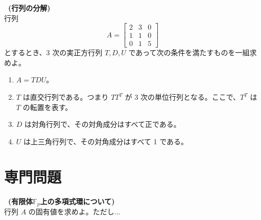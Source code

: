\documentclass[12pt]{article}
\renewcommand{\labelenumi}{(\arabic{enumi})}
\newcommand{\mondai}[2]{\textbf{\fbox{#1}\ (#2)}}
\newcommand{\F}{\mathbb{F}}
\begin{document}
\begin{comment}
### **(1) 漸化式の導出**
積分の中にべき乗や対数が含まれている場合、部分積分を繰り返すことで**漸化式**を導くことができます。  
この手法は、多くの難関大学の入試や大学院試験、数学オリンピックでも頻出です。

例えば、部分積分の基本形
\[
\int u dv = uv - \int v du
\]
を使うことで、\( I_n \) を \( I_{n-1} \) の形に帰着させます。  
これにより、再帰的に求めることができるようになります。

---

## **この問題の背景**
これらの問題は **解析学（微積分・関数の性質）** に関するものです。  
大学数学や大学院試験の頻出テーマであり、数学オリンピックや難関大学の入試にも登場します。

特に **極限の評価・関数の滑らかさ・級数展開** などは、高度な数学を学ぶ上で重要なトピックです。  
また、漸化式の導出は **数学的帰納法や数列の解析** にもつながります。

---

## **基礎知識として必要なもの**
✅ **ロピタルの定理**（極限の計算）  
✅ **テイラー展開・マクローリン展開**（関数の近似）  
✅ **部分積分**（積分の計算テクニック）  
✅ **漸化式の考え方**（数学的帰納法と組み合わせて使う）  
✅ **微分可能性の定義**（左右の微分係数をそろえる）

---

この問題を解くことで、解析学の理解が深まり、入試・数学オリンピック・大学院試験での応用力が身につきます！
\end{comment}

\newpage

\mondai{A2}{行列の分解}\\

行列
\[
    A = \begin{bmatrix} 2 & 3 & 0 \\ 1 & 1 & 0 \\ 0 & 1 & 5 \end{bmatrix}
\]
とするとき、3 次の実正方行列 $T, D, U$ であって次の条件を満たすものを一組求めよ。

\begin{enumerate}
    \renewcommand{\labelenumi}{(\roman{enumi})}
    \item $A = TDU$。
    \item $T$ は直交行列である。つまり $TT^T$ が 3 次の単位行列となる。ここで、$T^T$ は $T$ の転置を表す。
    \item $D$ は対角行列で、その対角成分はすべて正である。
    \item $U$ は上三角行列で、その対角成分はすべて 1 である。
\end{enumerate}

\newpage

\section{専門問題}
\mondai{B1}{有限体$\F_p$上の多項式環について}\\

行列 $A$ の固有値を求めよ。ただし...
\end{document}

